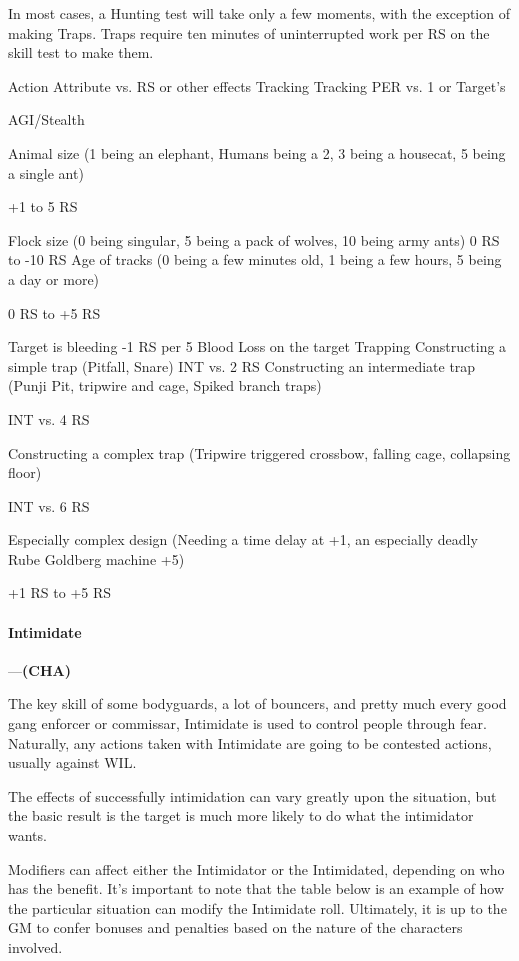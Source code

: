 \documentclass[oneside,11pt,english]{book}
\begin{document}
In most cases, a Hunting test will take only a few moments, with the exception of making Traps. Traps require ten minutes of uninterrupted work per RS on the skill test to make them.


Action Attribute vs. RS or other 
effects 
Tracking 
Tracking PER vs. 1 or Target’s 


AGI/Stealth 

Animal size (1 being an elephant, Humans being a 2, 3 being a housecat, 5 
being a single ant) 

+1 to 5 RS 

Flock size (0 being singular, 5 being a pack of wolves, 10 being army ants) 0 RS to -10 RS 
Age of tracks (0 being a few minutes old, 1 being a few hours, 5 being a 
day or more) 

0 RS to +5 RS 

Target is bleeding -1 RS per 5 Blood Loss on 
the target 
Trapping 
Constructing a simple trap (Pitfall, Snare) INT vs. 2 RS 
Constructing an intermediate trap (Punji Pit, tripwire and cage, Spiked 
branch traps) 

INT vs. 4 RS 

Constructing a complex trap (Tripwire triggered crossbow, falling cage, 
collapsing floor) 

INT vs. 6 RS 

Especially complex design (Needing a time delay at +1, an especially 
deadly Rube Goldberg machine +5) 

+1 RS to +5 RS 

 

 

\paragraph{\label{skill:Intimidate}Intimidate}---\quad\textbf{(CHA) }\par
The key skill of some bodyguards, a lot of bouncers, and pretty much every good gang enforcer or commissar, Intimidate is used to control people through fear. Naturally, any actions taken with Intimidate are going to be contested actions, usually against WIL.


The effects of successfully intimidation can vary greatly upon the situation, but the basic result is the target is much more likely to do what the intimidator wants.


Modifiers can affect either the Intimidator or the Intimidated, depending on who has the benefit. It’s important to note that the table below is an example of how the particular situation can modify the Intimidate roll. Ultimately, it is up to the GM to confer bonuses and penalties based on the nature of the characters involved.
\end{document}
